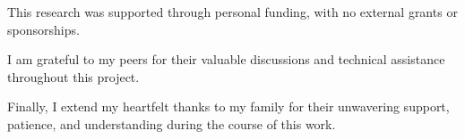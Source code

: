 \vspace{0.3cm}

This research was supported through personal funding, with no external grants or sponsorships.

I am grateful to my peers for their valuable discussions and technical assistance throughout this project.

\vspace{0.3cm}

Finally, I extend my heartfelt thanks to my family for their unwavering support, patience, and understanding during the course of this work.

\vspace{2cm}

\begin{flushright}
\textbf{\authorname}\\
\textbf{\rn}
\end{flushright}